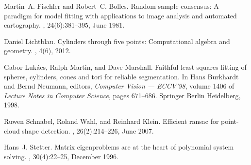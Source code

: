 \documentclass[5p]{elsarticle}
\begin{document}
\begin{thebibliography}{10}
Martin~A. Fischler and Robert~C. Bolles.
\newblock Random sample consensus: A paradigm for model fitting with
  applications to image analysis and automated cartography.
, 24(6):381--395, June 1981.

Daniel Lichtblau.
\newblock Cylinders through five points: Computational algebra and geometry.
, 4(6), 2012.

Gabor Luk{\'a}cs, Ralph Martin, and Dave Marshall.
\newblock Faithful least-squares fitting of spheres, cylinders, cones and tori
  for reliable segmentation.
\newblock In Hans Burkhardt and Bernd Neumann, editors, {\em Computer Vision
  --- ECCV'98}, volume 1406 of {\em Lecture Notes in Computer Science}, pages
  671--686. Springer Berlin Heidelberg, 1998.

Ruwen Schnabel, Roland Wahl, and Reinhard Klein.
\newblock Efficient ransac for point-cloud shape detection.
, 26(2):214--226, June 2007.

Hans~J. Stetter.
\newblock Matrix eigenproblems are at the heart of polynomial system solving.
, 30(4):22--25, December 1996.

\end{thebibliography}
\end{document}
